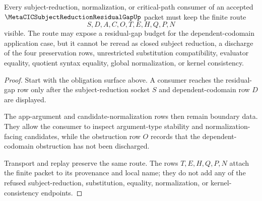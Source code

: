 \begin{theorem}
\label{thm:metacic-subject-reduction-residual-gap-nonescape}
Every subject-reduction, normalization, or critical-path consumer of an
accepted $\MetaCICSubjectReductionResidualGapUp$ packet must keep the finite
route
$$
S,D,A,C,O,T,E,H,Q,P,N
$$
visible. The route may expose a residual-gap budget for the
dependent-codomain application case, but it cannot be reread as closed subject
reduction, a discharge of the four preservation rows, unrestricted
substitution compatibility, evaluator equality, quotient syntax equality,
global normalization, or kernel consistency.
\end{theorem}
\begin{proof}
Start with the obligation surface above. A consumer reaches the residual-gap
row only after the subject-reduction socket $S$ and dependent-codomain row $D$
are displayed.

The app-argument and candidate-normalization rows then remain boundary data.
They allow the consumer to inspect argument-type stability and
normalization-facing candidates, while the obstruction row $O$ records that
the dependent-codomain obstruction has not been discharged.

Transport and replay preserve the same route. The rows $T,E,H,Q,P,N$ attach
the finite packet to its provenance and local name; they do not add any of the
refused subject-reduction, substitution, equality, normalization, or
kernel-consistency endpoints.
\end{proof}




